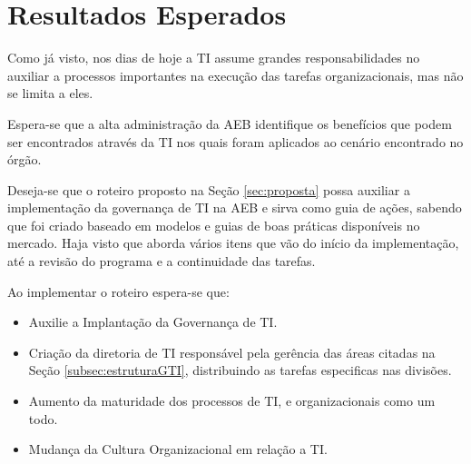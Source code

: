 \section{Resultados Esperados}\label{sec:res}

Como já visto, nos dias de hoje a TI assume grandes responsabilidades no auxiliar a processos importantes na execução das tarefas organizacionais, mas não se limita a eles.

Espera-se que a alta administração da AEB identifique os benefícios que podem ser encontrados através da TI nos quais foram aplicados ao cenário encontrado no órgão.

Deseja-se que o roteiro proposto na Seção \ref{sec:proposta} possa auxiliar a implementação da governança de TI na AEB e sirva como guia de ações, sabendo que foi criado baseado em modelos e guias de boas práticas disponíveis no mercado. Haja visto que aborda vários itens que vão do início da implementação, até a revisão do programa e a continuidade das tarefas.

Ao implementar o roteiro espera-se que:

\begin{itemize}
\item Auxilie a Implantação da Governança de TI.
\item Criação da diretoria de TI  responsável pela gerência das áreas citadas na Seção
\ref{subsec:estruturaGTI}, distribuindo as tarefas especificas nas divisões.
\item Aumento da maturidade dos processos de TI, e organizacionais como um todo.
\item Mudança da Cultura Organizacional em relação a TI.
\end{itemize}





  